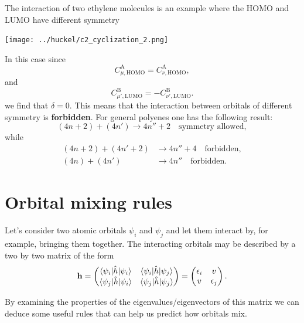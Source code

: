 \documentclass[../Main/chem532-notes.tex]{subfiles}
\begin{document}
The interaction of two ethylene molecules is an example where the HOMO and LUMO have different symmetry

\texttt{[image: ../huckel/c2\_cyclization\_2.png]}

In this case since
\begin{equation}
C_{\mu,\mathrm{HOMO}}^\mathrm{A} = C_{\nu,\mathrm{HOMO}}^\mathrm{A},
\end{equation}
and
\begin{equation}
C_{\mu',\mathrm{LUMO}}^\mathrm{B} = - C_{\nu',\mathrm{LUMO}}^\mathrm{B}.
\end{equation}
we find that $\delta = 0$.
This means that the interaction between orbitals of different symmetry is \textbf{forbidden}.
For general polyenes one has the following result:
\begin{equation}
(4n + 2) + (4n') \rightarrow 4 n'' + 2 \quad \text{symmetry allowed},
\end{equation}
while
\begin{equation}
\begin{split}
(4n + 2) + (4n' + 2) & \rightarrow 4 n'' +4\quad \text{forbidden}, \\
(4n) + (4n') & \rightarrow 4 n''\quad \text{forbidden}.
\end{split}
\end{equation}


\section{Orbital mixing rules}
Let's consider two atomic orbitals $\psi_i$ and $\psi_j$ and let them interact by, for example, bringing them together.
The interacting orbitals may be described by a two by two matrix of the form
\begin{equation}
\mathbf{h} = 
\begin{pmatrix}
\braket{\psi_i | \hat{h} |\psi_i} & \braket{\psi_i | \hat{h} |\psi_j} \\
\braket{\psi_j | \hat{h} |\psi_i} & \braket{\psi_j | \hat{h} |\psi_j}
\end{pmatrix}
=
\begin{pmatrix}
\epsilon_i & v \\
v & \epsilon_j
\end{pmatrix}.
\end{equation}

By examining the properties of the eigenvalues/eigenvectors of this matrix we can deduce some useful rules that can help us predict how orbitals mix.
\end{document}
